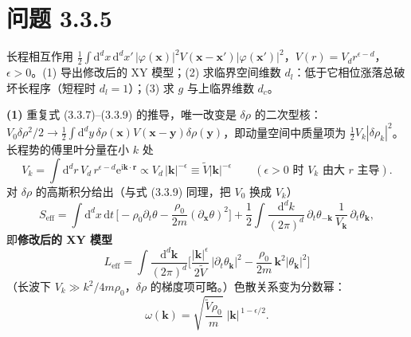 \section*{问题 3.3.5}
\begin{problem}
长程相互作用 $\frac12\int\mathrm{d}^dx\,\mathrm{d}^dx'\,|\varphi(\pmb{x})|^{2}V(\pmb{x}-\pmb{x}')|\varphi(\pmb{x}')|^{2}$，$V(r)=V_dr^{\epsilon-d}$，$\epsilon>0$。(1) 导出修改后的 XY 模型；(2) 求临界空间维数 $d_l$：低于它相位涨落总破坏长程序（短程时 $d_l=1$）；(3) 求 $g$ 与上临界维数 $d_c$。
\end{problem}
\solution

\textbf{(1)} 重复式 (3.3.7)--(3.3.9) 的推导，唯一改变是 $\delta\rho$ 的二次型核：$V_0\delta\rho^{2}/2\to\frac12\int\mathrm{d}^dy\,\delta\rho(\pmb{x})V(\pmb{x}-\pmb{y})\delta\rho(\pmb{y})$，即动量空间中质量项为 $\frac12V_k|\delta\rho_k|^{2}$。长程势的傅里叶分量在小 $k$ 处
\begin{equation*}
V_k=\int\mathrm{d}^dr\,V_d\,r^{\epsilon-d}\mathrm{e}^{\mathrm{i}\pmb{k}\cdot\pmb{r}}
\propto V_d\,|\pmb{k}|^{-\epsilon}\equiv\tilde V|\pmb{k}|^{-\epsilon}
\qquad(\epsilon>0 \text{ 时 } V_k \text{ 由大 } r \text{ 主导}) .
\end{equation*}
对 $\delta\rho$ 的高斯积分给出（与式 (3.3.9) 同理，把 $V_0$ 换成 $V_k$）
\begin{equation*}
S_{\mathrm{eff}}=\int\mathrm{d}^dx\,\mathrm{d}t\,\Big[-\rho_0\partial_t\theta-\frac{\rho_0}{2m}(\partial_{\pmb{x}}\theta)^{2}\Big]
+\frac12\int\frac{\mathrm{d}^dk}{(2\pi)^d}\,\partial_t\theta_{-\pmb{k}}\,\frac{1}{V_{\pmb{k}}}\,\partial_t\theta_{\pmb{k}} ,
\end{equation*}
即\textbf{修改后的 XY 模型}
\begin{equation*}
\boxed{\;L_{\mathrm{eff}}=\int\frac{\mathrm{d}^d\pmb{k}}{(2\pi)^{d}}
\Big[\frac{|\pmb{k}|^{\epsilon}}{2\tilde V}\,|\partial_t\theta_{\pmb{k}}|^{2}
-\frac{\rho_0}{2m}\,\pmb{k}^{2}|\theta_{\pmb{k}}|^{2}\Big]\;}
\end{equation*}
（长波下 $V_k\gg k^{2}/4m\rho_0$，$\delta\rho$ 的梯度项可略。）色散关系变为分数幂：
\begin{equation*}
\omega(\pmb{k})=\sqrt{\frac{\tilde V\rho_0}{m}}\;|\pmb{k}|^{\,1-\epsilon/2} .
\end{equation*}

